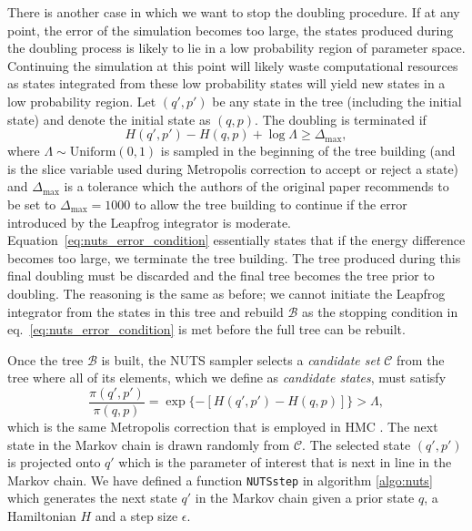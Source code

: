 There is another case in which we want to stop the doubling procedure. If at any point, the error of the simulation becomes too large,
the states produced during the doubling process is likely to lie in a low probability region of parameter space. Continuing the simulation at this point will likely waste computational resources as states integrated from these low probability states will yield new states in a low probability region. Let $(q', p')$ be any state in the tree (including the initial state) and denote the initial state as $(q, p)$. The doubling is terminated if
\begin{equation}\label{eq:nuts_error_condition}
    H(q', p') - H(q, p) + \log \Lambda \geq \Delta_\text{max},
\end{equation}
where $\Lambda \sim \text{Uniform}(0, 1)$ is sampled in the beginning of the tree building (and is the slice variable used during Metropolis correction to accept or reject a state) and $\Delta_\text{max}$ is a tolerance which the authors of the original paper recommends to be set to $\Delta_\text{max} = 1000$ to allow the tree building to continue if the error introduced by the Leapfrog integrator is moderate. Equation~\eqref{eq:nuts_error_condition} essentially states that if the energy difference becomes too large, we terminate the tree building. The tree produced during this final doubling must be discarded and the final tree becomes the tree prior to doubling. The reasoning is the same as before; we cannot initiate the Leapfrog integrator from the states in this tree and rebuild $\mathcal{B}$ as the stopping condition in eq.~\eqref{eq:nuts_error_condition} is met before the full tree can be rebuilt.

Once the tree $\mathcal{B}$ is built, the NUTS sampler selects a \textit{candidate set} $\mathcal{C}$ from the tree where all of its elements, which we define as \textit{candidate states}, must satisfy
\begin{equation}\label{eq:nuts_acceptance}
    \frac{\pi(q', p')}{\pi(q, p)} = \exp\{-[H(q', p') - H(q, p) ]\} > \Lambda,
\end{equation}
which is the same Metropolis correction that is employed in HMC \cite{nuts_joonha_park}. The next state in the Markov chain is drawn randomly from $\mathcal{C}$. The selected state $(q', p')$ is projected onto $q'$ which is the parameter of interest that is next in line in the Markov chain. We have defined a function {\tt NUTSstep} in algorithm \ref{algo:nuts} which generates the next state $q'$ in the Markov chain given a prior state $q$, a Hamiltonian $H$ and a step size $\epsilon$.

